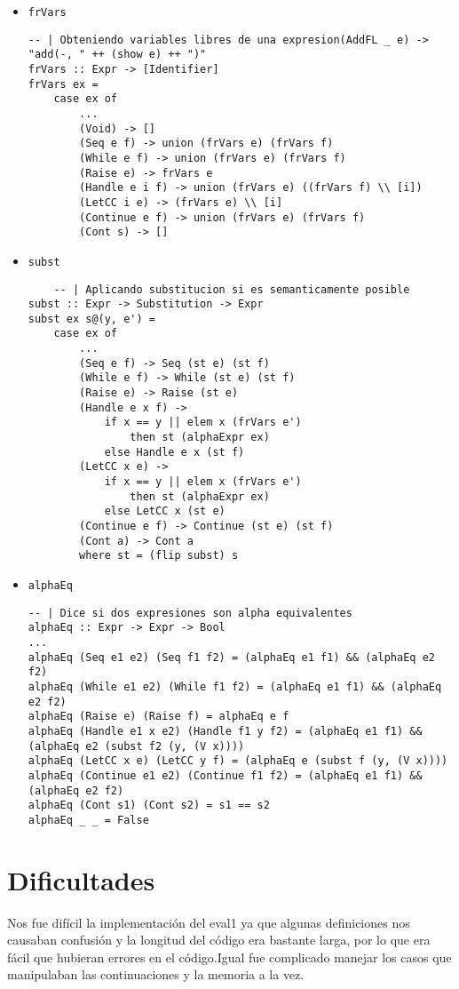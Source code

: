 \documentclass{article}
\newcommand{\tx}[1]{\texttt{#1}}
\begin{document}
    \begin{itemize}
        \item \tx{frVars}
        \begin{verbatim}
-- | Obteniendo variables libres de una expresion(AddFL _ e) -> "add(-, " ++ (show e) ++ ")"
frVars :: Expr -> [Identifier]
frVars ex =
	case ex of
		...
		(Void) -> []
		(Seq e f) -> union (frVars e) (frVars f)
		(While e f) -> union (frVars e) (frVars f)
		(Raise e) -> frVars e
		(Handle e i f) -> union (frVars e) ((frVars f) \\ [i])
		(LetCC i e) -> (frVars e) \\ [i]
		(Continue e f) -> union (frVars e) (frVars f)
		(Cont s) -> []
        \end{verbatim}
        
        
        \item \tx{subst}
        \begin{verbatim}
    -- | Aplicando substitucion si es semanticamente posible
subst :: Expr -> Substitution -> Expr
subst ex s@(y, e') =
	case ex of
		...
		(Seq e f) -> Seq (st e) (st f)
		(While e f) -> While (st e) (st f)
		(Raise e) -> Raise (st e)
		(Handle e x f) ->
			if x == y || elem x (frVars e')
				then st (alphaExpr ex)
			else Handle e x (st f)
		(LetCC x e) ->
			if x == y || elem x (frVars e')
				then st (alphaExpr ex)
			else LetCC x (st e)
		(Continue e f) -> Continue (st e) (st f)
		(Cont a) -> Cont a
		where st = (flip subst) s
        \end{verbatim}
        
        \item \tx{alphaEq}
        \begin{verbatim}
-- | Dice si dos expresiones son alpha equivalentes
alphaEq :: Expr -> Expr -> Bool
...
alphaEq (Seq e1 e2) (Seq f1 f2) = (alphaEq e1 f1) && (alphaEq e2 f2)
alphaEq (While e1 e2) (While f1 f2) = (alphaEq e1 f1) && (alphaEq e2 f2)
alphaEq (Raise e) (Raise f) = alphaEq e f
alphaEq (Handle e1 x e2) (Handle f1 y f2) = (alphaEq e1 f1) && (alphaEq e2 (subst f2 (y, (V x))))
alphaEq (LetCC x e) (LetCC y f) = (alphaEq e (subst f (y, (V x))))
alphaEq (Continue e1 e2) (Continue f1 f2) = (alphaEq e1 f1) && (alphaEq e2 f2)
alphaEq (Cont s1) (Cont s2) = s1 == s2
alphaEq _ _ = False
        \end{verbatim}
    \end{itemize}

    \section*{Dificultades}
    Nos fue difícil la implementación del eval1 ya que algunas definiciones nos causaban confusión y la longitud del código era bastante larga, por lo que era fácil que hubieran errores en el código.Igual fue complicado manejar los casos que manipulaban las continuaciones y la memoria a la vez.
    
\end{document}
